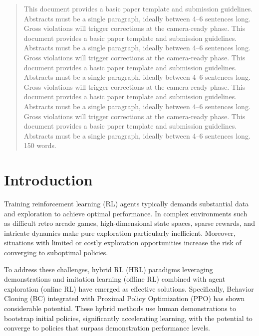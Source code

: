 \documentclass{article}
\begin{document}
\begin{abstract}
      This document provides a basic paper template and submission guidelines.
      Abstracts must be a single paragraph, ideally between 4--6 sentences long.
      Gross violations will trigger corrections at the camera-ready phase.
      This document provides a basic paper template and submission guidelines.
      Abstracts must be a single paragraph, ideally between 4--6 sentences long.
      Gross violations will trigger corrections at the camera-ready phase.
      This document provides a basic paper template and submission guidelines.
      Abstracts must be a single paragraph, ideally between 4--6 sentences long.
      Gross violations will trigger corrections at the camera-ready phase.
      This document provides a basic paper template and submission guidelines.
      Abstracts must be a single paragraph, ideally between 4--6 sentences long.
      Gross violations will trigger corrections at the camera-ready phase.
      This document provides a basic paper template and submission guidelines.
      Abstracts must be a single paragraph, ideally between 4--6 sentences long.
      150 words.
\end{abstract}

\section{Introduction}


Training reinforcement learning (RL) agents typically demands substantial 
data and exploration to achieve optimal performance. In complex environments 
such as difficult retro arcade games, high-dimensional state spaces, sparse rewards, 
and intricate dynamics make pure exploration particularly inefficient. 
Moreover, situations with limited or costly exploration opportunities 
increase the risk of converging to suboptimal policies.

To address these challenges, hybrid RL (HRL) paradigms leveraging demonstrations 
and imitation learning (offline RL) combined with agent exploration (online 
RL) have emerged as effective solutions. Specifically, Behavior Cloning (BC) 
integrated with Proximal Policy Optimization (PPO) has shown considerable 
potential. These hybrid methods use human demonstrations to bootstrap initial 
policies, significantly accelerating learning, with the potential to converge 
to policies that surpass demonstration performance levels.
\end{document}
